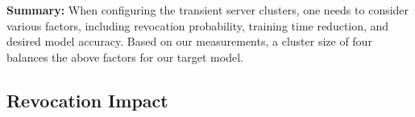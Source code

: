 


\textbf{Summary:} When configuring the transient server clusters, one needs to
consider various factors, including revocation probability, training time
reduction, and desired model accuracy.  Based on our measurements, a cluster
size of four balances the above factors for our target model. 




\subsection{Revocation Impact}
\label{subsec:revocation}


